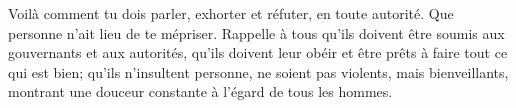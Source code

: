 Voilà comment tu dois parler, exhorter et réfuter, en toute autorité.
	Que personne n’ait lieu de te mépriser.
Rappelle à tous qu’ils doivent être soumis aux gouvernants et aux autorités,
	qu’ils doivent leur obéir et être prêts à faire tout ce qui est bien;
	qu’ils n’insultent personne, ne soient pas violents,
	mais bienveillants, montrant une douceur constante à l’égard de tous les hommes.
